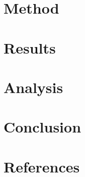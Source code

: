 \documentclass[]{article}
\begin{document}
\section*{Method}

\section*{Results}

\section*{Analysis}


\section*{Conclusion}

\section*{References}
\end{document}
